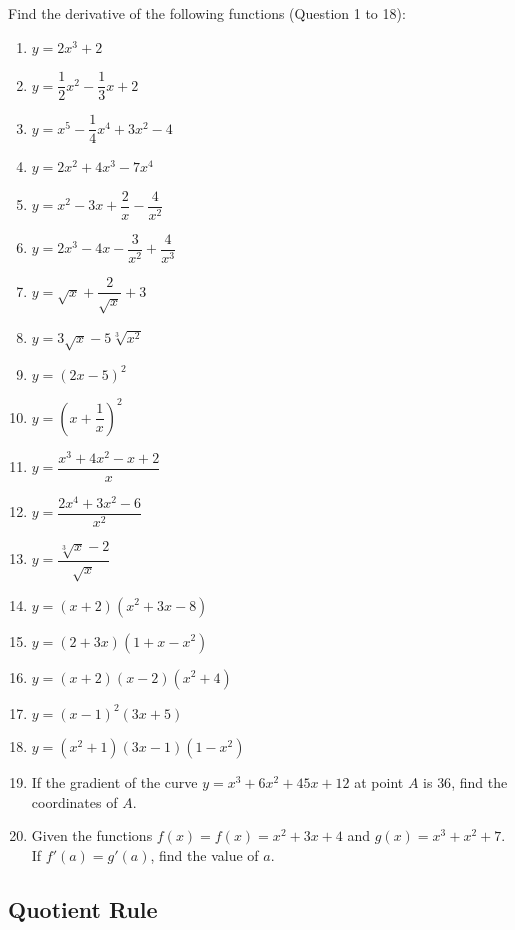 \documentclass[12pt]{report}
\begin{document}
\setlength{\columnseprule}{1pt}
\setlength{\columnsep}{24pt}
\begin{multicols}{2}
  \noindent Find the derivative of the following functions (Question 1 to 18):
  \begin{enumerate}
    \item $y=2x^{3}+2$
    \item $y={\dfrac{1}{2}}x^{2}-{\dfrac{1}{3}}x+2$
    \item $y=x^{5}-{\dfrac{1}{4}}x^{4}+3x^{2}-4$
    \item $y=2x^{2}+4x^{3}-7x^{4}$
    \item $y=x^{2}-3x+{\dfrac{2}{x}}-{\dfrac{4}{x^{2}}}$
    \item $y=2x^{3}-4x-{\dfrac{3}{x^{2}}}+{\dfrac{4}{x^{3}}}$
    \item $y={\sqrt{x}}+{\dfrac{2}{\sqrt{x}}}+3$
    \item $y=3{\sqrt{x}}-5{\sqrt[3]{x^{2}}}$
    \item $y={(2x-5)}^{2}$
    \item $y={\left(x+{\dfrac{1}{x}}\right)}^{2}$
    \item $y=\dfrac{x^{3}+4x^{2}-x+2}{x}$
    \item $y=\dfrac{2x^{4}+3x^{2}-6}{x^{2}}$
    \item $y=\dfrac{\sqrt[3]{x}-2}{\sqrt{x}}$
    \item $y=\left(x+2\right)\left(x^{2}+3x-8\right)$
    \item $y=\left(2+3x\right)\left(1+x-x^{2}\right)$
    \item $y=\left(x+2\right)\left(x-2\right)\left(x^{2}+4\right)$
    \item $y={(x-1)}^{2}(3x+5)$
    \item $y=\left(x^{2}+1\right)\left(3x-1\right)\left(1-x^{2}\right)$
    \item If the gradient of the curve $y = x^3 + 6x^2 + 45x + 12$ at point $A$ is $36$,
          find the coordinates of $A$.
    \item Given the functions $f (x) = f (x) = x^2 + 3x + 4$ and $g(x) = x^3 + x^2 + 7$.
          If $f' (a) = g' (a)$, find the value of $a$.
  \end{enumerate}
\end{multicols}

\subsection*{Quotient Rule}
\end{document}

